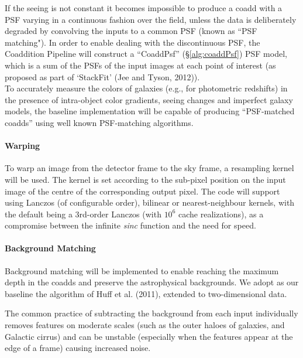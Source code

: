\documentclass[12pt]{article}
\begin{document}
If the seeing is not constant it becomes impossible to produce a coadd with a PSF varying in a continuous fashion over the field, unless the data is deliberately degraded by convolving the inputs to a common PSF (known as ``PSF matching").  In order to enable dealing with the discontinuous PSF, the Coaddition Pipeline will construct a ``CoaddPsf'' (\S\ref{alg:coaddPsf}) PSF model, which is a sum of the PSFs of the input images at each point of interest (as proposed as part of `StackFit' (Jee and Tyson, 2012)).
\\

To accurately measure the colors of galaxies (e.g., for photometric redshifts) in the presence of intra-object color gradients, seeing changes and imperfect galaxy models, the baseline implementation will be capable of producing ``PSF-matched coadds'' using well known PSF-matching algorithms.

\paragraph{Warping}
\label{alg:warp}
To warp an image from the detector frame to the sky frame, a resampling kernel will be used. The kernel is set according to the sub-pixel position on the input image of the centre of the corresponding output pixel.  The code will support using Lanczos (of configurable order), bilinear or nearest-neighbour kernels, with the default being a 3rd-order Lanczos (with $10^6$ cache realizations), as a compromise between the infinite {\em sinc} function and the need for speed. %

\paragraph{Background Matching}
\label{alg:backgroundMatching}

Background matching will be implemented to enable reaching the maximum depth in the coadds and preserve the astrophysical backgrounds.  We adopt as our baseline the algorithm of Huff et al. (2011), extended to two-dimensional data.

The common practice of subtracting the background from each input individually removes features on moderate scales (such as the outer haloes of galaxies, and Galactic cirrus) and can be unstable (especially when the features appear at the edge of a frame) causing increased noise.
\end{document}
